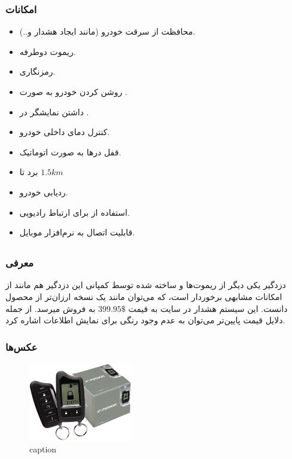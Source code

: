 \documentclass[a4paper,12pt]{report}
\begin{document}
	\subsubsection{
		امکانات
	}\label{subsubsec3:subsec1:sec3:chap1}
	\begin{itemize}[nosep]\label{item1:subsec1:sec3:chap1}
		\item
			محافظت از سرقت خودرو (مانند ایجاد هشدار و..).
		\item
			ریموت دوطرفه.
		\item
			رمزنگاری.
		\item
			روشن کردن خودرو به صورت
			.
		\item
			داشتن نمایشگر
			در
			.
		\item
			کنترل دمای داخلی خودرو.
		\item
			قفل درها به صورت اتوماتیک.
		\item
			برد
				تا
			$1.5 km$
		\item
			ردیابی خودرو.
		\item
			استفاده از
			برای ارتباط رادیویی.
		\item
			قابلیت اتصال به نرم‌افزار موبایل.
	\end{itemize}

	\subsection{
	}\label{subsec2:sec3:chap1}
	\subsubsection{
		معرفی
	}\label{subsubsec1:subsec2:sec2:chap1}
	دزدگیر
	یکی دیگر از ریموت‌ها و  ساخته شده توسط کمپانی
	این دزدگیر هم مانند
	از امکانات مشابهی برخوردار است، که می‌توان مانند یک نسخه ارزان‌تر از محصول
	دانست. این سیستم هشدار در سایت
		به قیمت
	$399.95\$$
	به فروش میرسد. از جمله دلایل قیمت پایین‌تر می‌توان به عدم وجود
	رنگی برای نمایش اطلاعات اشاره کرد.
	\cite{PythonHo3:online}
	\subsubsection{
		عکس‌ها
	}\label{subsubsec2:subsec2:sec3:chap1}
	\begin{figure}[!h]
		\label{fig1:subsec2:sec3:chap1}
		\begin{center}
			\includegraphics[width=0.4\textwidth]{resources/Python_5760P.jpg}
			\caption{caption}
		\end{center}
	\end{figure}
\end{document}

